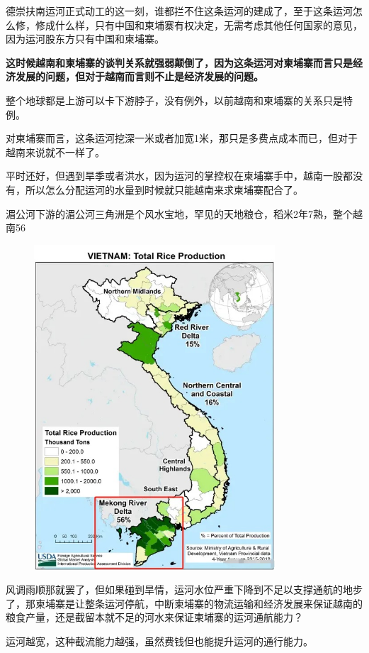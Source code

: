 \documentclass[UTF8, 11pt, oneside]{ctexart}
\newcommand{\zd}[1]{\textbf{\textcolor[RGB]{123,12,0}{#1}}} %
\begin{document}
德崇扶南运河正式动工的这一刻，谁都拦不住这条运河的建成了，至于这条运河怎么修，修成什么样，只有中国和柬埔寨有权决定，无需考虑其他任何国家的意见，因为运河股东方只有中国和柬埔寨。

\zd{这时候越南和柬埔寨的谈判关系就强弱颠倒了，因为这条运河对柬埔寨而言只是经济发展的问题，但对于越南而言则不止是经济发展的问题。}

整个地球都是上游可以卡下游脖子，没有例外，以前越南和柬埔寨的关系只是特例。

对柬埔寨而言，这条运河挖深一米或者加宽1米，那只是多费点成本而已，但对于越南来说就不一样了。

平时还好，但遇到旱季或者洪水，因为运河的掌控权在柬埔寨手中，越南一股都没有，所以怎么分配运河的水量到时候就只能越南来求柬埔寨配合了。

湄公河下游的湄公河三角洲是个风水宝地，罕见的天地粮仓，稻米2年7熟，整个越南56%

\begin{figure}[H]
    \centering
    \includegraphics[width=9cm]{2024-08-17-003.jpg}
\end{figure}

风调雨顺那就罢了，但如果碰到旱情，运河水位严重下降到不足以支撑通航的地步了，那柬埔寨是让整条运河停航，中断柬埔寨的物流运输和经济发展来保证越南的粮食产量，还是截留本就不足的河水来保证柬埔寨的运河通航能力？

运河越宽，这种截流能力越强，虽然费钱但也能提升运河的通行能力。
\end{document}
